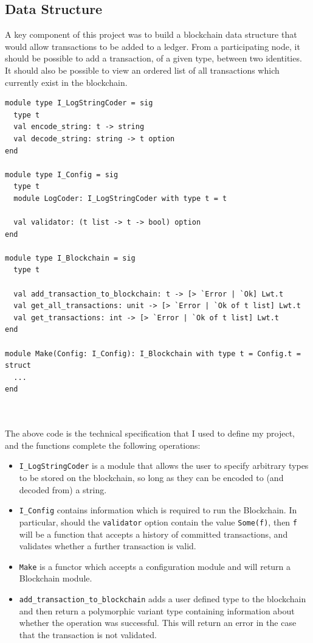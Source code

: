 \documentclass[12pt,a4paper,twoside,openright]{report}
\begin{document}
	\subsection{Data Structure}
	A key component of this project was to build a blockchain data structure that would allow transactions to be added to a ledger. 
	From a participating node, it should be possible to add a transaction, of a given type, between two identities. 
	It should also be possible to view an ordered list of all transactions which currently exist in the blockchain.
	\begin{minipage}{\linewidth}
	\begin{lstlisting}
module type I_LogStringCoder = sig
  type t
  val encode_string: t -> string
  val decode_string: string -> t option
end

module type I_Config = sig
  type t
  module LogCoder: I_LogStringCoder with type t = t

  val validator: (t list -> t -> bool) option
end

module type I_Blockchain = sig
  type t

  val add_transaction_to_blockchain: t -> [> `Error | `Ok] Lwt.t
  val get_all_transactions: unit -> [> `Error | `Ok of t list] Lwt.t
  val get_transactions: int -> [> `Error | `Ok of t list] Lwt.t
end

module Make(Config: I_Config): I_Blockchain with type t = Config.t = struct 
  ...
end
	\end{lstlisting}
	\end{minipage}\\
	\\
	The above code is the technical specification that I used to define my project, and the functions complete the following operations:
	\begin{itemize}
		\item \texttt{I\_LogStringCoder} is a module that allows the user to specify arbitrary types to be stored on the blockchain, so long as they can be encoded to (and decoded from) a string.
		\item \texttt{I\_Config} contains information which is required to run the Blockchain.
			In particular, should the \texttt{validator} option contain the value \texttt{Some(f)}, then \texttt{f} will be a function that accepts a history of committed transactions, and validates whether a further transaction is valid. 
		\item \texttt{Make} is a functor which accepts a configuration module and will return a Blockchain module.
		\item \texttt{add\_transaction\_to\_blockchain} adds a user defined type to the blockchain and then return a polymorphic variant type containing information about whether the operation was successful. 
			This will return an error in the case that the transaction is not validated.
	\end{itemize} 
\end{document}
